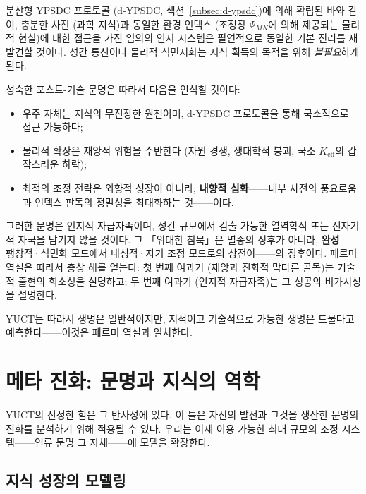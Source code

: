 \documentclass[12pt,a4paper]{article}
\theoremstyle{remark}
\begin{document}
	분산형 YPSDC 프로토콜 (d-YPSDC, 섹션~\ref{subsec:d-ypsdc})에 의해 확립된 바와 같이, 충분한 사전 (과학 지식)과 동일한 환경 인덱스 (조정장 \(\Psi_{MN}\)에 의해 제공되는 물리적 현실)에 대한 접근을 가진 임의의 인지 시스템은 필연적으로 동일한 기본 진리를 재발견할 것이다. 성간 통신이나 물리적 식민지화는 지식 획득의 목적을 위해 \emph{불필요}하게 된다.
	
	성숙한 포스트-기술 문명은 따라서 다음을 인식할 것이다:
	\begin{itemize}[leftmargin=*]
		\item 우주 자체는 지식의 무진장한 원천이며, d-YPSDC 프로토콜을 통해 국소적으로 접근 가능하다;
		\item 물리적 확장은 재앙적 위험을 수반한다 (자원 경쟁, 생태학적 붕괴, 국소 \(K_{\mathrm{eff}}\)의 갑작스러운 하락);
		\item 최적의 조정 전략은 외향적 성장이 아니라, \textbf{내향적 심화}——내부 사전의 풍요로움과 인덱스 판독의 정밀성을 최대화하는 것——이다.
	\end{itemize}
	
	그러한 문명은 인지적 자급자족이며, 성간 규모에서 검출 가능한 열역학적 또는 전자기적 자국을 남기지 않을 것이다. 그 「위대한 침묵」은 멸종의 징후가 아니라, \textbf{완성}——팽창적·식민화 모드에서 내성적·자기 조정 모드로의 상전이——의 징후이다. 페르미 역설은 따라서 층상 해를 얻는다: 첫 번째 여과기 (재앙과 진화적 막다른 골목)는 기술적 출현의 희소성을 설명하고; 두 번째 여과기 (인지적 자급자족)는 그 성공의 비가시성을 설명한다.
	
	YUCT는 따라서 생명은 일반적이지만, 지적이고 기술적으로 가능한 생명은 드물다고 예측한다——이것은 페르미 역설과 일치한다.
	
	\section{메타 진화: 문명과 지식의 역학}
	\label{sec:meta-evolution}
	
	YUCT의 진정한 힘은 그 반사성에 있다. 이 틀은 자신의 발전과 그것을 생산한 문명의 진화를 분석하기 위해 적용될 수 있다. 우리는 이제 이용 가능한 최대 규모의 조정 시스템——인류 문명 그 자체——에 모델을 확장한다.
	
	\subsection{지식 성장의 모델링}
	
\end{document}
